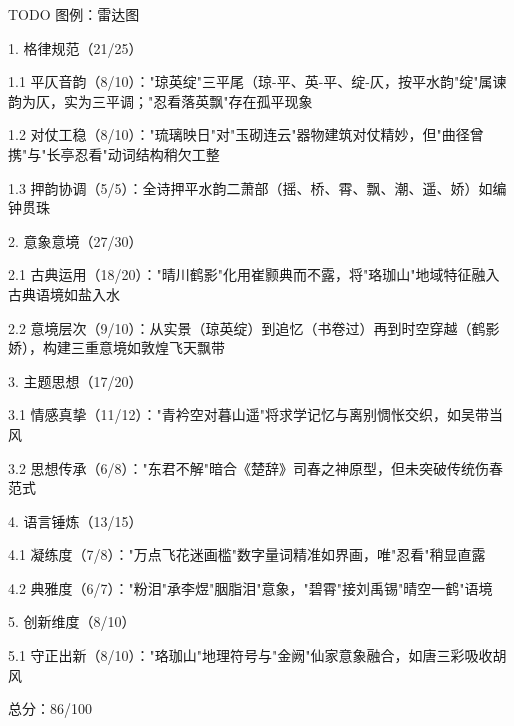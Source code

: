 TODO 图例：雷达图

\begin{tcolorbox}[
  colback=white, %
  colframe=black, 
  boxrule=1pt,        %
  arc=0mm             %
  ]
  \kaishu 
  [评分]\par
  1. 格律规范（21/25）\par
  \hspace{2em}1.1 平仄音韵（8/10）："琼英绽"三平尾（琼-平、英-平、绽-仄，按平水韵"绽"属谏韵为仄，实为三平调；"忍看落英飘"存在孤平现象\par
  \hspace{2em}1.2 对仗工稳（8/10）："琉璃映日"对"玉砌连云"器物建筑对仗精妙，但"曲径曾携"与"长亭忍看"动词结构稍欠工整\par
  \hspace{2em}1.3 押韵协调（5/5）：全诗押平水韵二萧部（摇、桥、霄、飘、潮、遥、娇）如编钟贯珠\par
  2. 意象意境（27/30）\par
  \hspace{2em}2.1 古典运用（18/20）："晴川鹤影"化用崔颢典而不露，将"珞珈山"地域特征融入古典语境如盐入水\par
  \hspace{2em}2.2 意境层次（9/10）：从实景（琼英绽）到追忆（书卷过）再到时空穿越（鹤影娇），构建三重意境如敦煌飞天飘带\par
  3. 主题思想（17/20）\par
  \hspace{2em}3.1 情感真挚（11/12）："青衿空对暮山遥"将求学记忆与离别惆怅交织，如吴带当风\par
  \hspace{2em}3.2 思想传承（6/8）："东君不解"暗合《楚辞》司春之神原型，但未突破传统伤春范式\par
  4. 语言锤炼（13/15）\par
  \hspace{2em}4.1 凝练度（7/8）："万点飞花迷画槛"数字量词精准如界画，唯"忍看"稍显直露\par
  \hspace{2em}4.2 典雅度（6/7）："粉泪"承李煜"胭脂泪"意象，"碧霄"接刘禹锡"晴空一鹤"语境\par
  5. 创新维度（8/10）\par
  \hspace{2em}5.1 守正出新（8/10）："珞珈山"地理符号与"金阙"仙家意象融合，如唐三彩吸收胡风\par
  总分：86/100
\end{tcolorbox}

